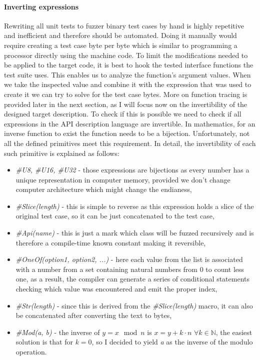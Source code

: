 \paragraph{Inverting expressions}
Rewriting all unit tests to fuzzer binary test cases by hand is highly repetitive and inefficient and therefore should be automated. Doing it manually would require creating a test case byte per byte which is similar to programming a processor directly using the machine code. To limit the modifications needed to be applied to the target code, it is best to hook the tested interface functions the test suite uses. This enables us to analyze the function's argument values. When we take the inspected value and combine it with the expression that was used to create it we can try to solve for the test case bytes. More on function tracing is provided later in the next section, as I will focus now on the invertibility of the designed target description. To check if this is possible we need to check if all expressions in the API description language are invertible. In mathematics, for an inverse function to exist the function needs to be a bijection. Unfortunately, not all the defined primitives meet this requirement. In detail, the invertibility of each such primitive is explained as follows:
\begin{itemize}
    \item \textit{\#U8, \#U16, \#U32} - those expressions are bijections as every number has a unique representation in computer memory, provided we don't change computer architecture which might change the endianess,
    \item \textit{\#Slice(length)} - this is simple to reverse as this expression holds a slice of the original test case, so it can be just concatenated to the test case,
    \item \textit{\#Api(name)} - this is just a mark which class will be fuzzed recursively and is therefore a compile-time known constant making it reversible,
    \item \textit{\#OneOf(option1, option2, ...)} - here each value from the list is associated with a number from a set containing natural numbers from 0 to count less one, as a result, the compiler can generate a series of conditional statements checking which value was encountered and emit the proper index,
    \item \textit{\#Str(length)} - since this is derived from the \textit{\#Slice(length)} macro, it can also be concatenated after converting the text to bytes,
    \item \textit{\#Mod(a, b)} - the inverse of $y = x \mod n$ is $x = y + k \cdot n$ $\forall k \in \mathbb{N}$, the easiest solution is that for $ k=0 $, so I decided to yield \textit{a} as the inverse of the modulo operation.
\end{itemize}
